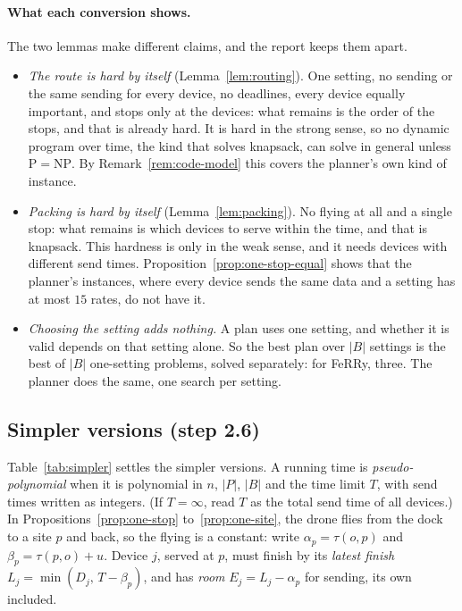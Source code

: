 \paragraph{What each conversion shows.} The two lemmas make different
claims, and the report keeps them apart.
\begin{itemize}
  \item \emph{The route is hard by itself} (Lemma~\ref{lem:routing}). One
    setting, no sending or the same sending for every device, no
    deadlines, every device equally important, and stops only at the
    devices: what remains is the order of the stops, and that is already
    hard. It is hard in the strong sense, so no dynamic program over time,
    the kind that solves knapsack, can solve \PLAN{} in general unless
    $\mathrm{P}=\mathrm{NP}$. By Remark~\ref{rem:code-model} this covers the
    planner's own kind of instance.
  \item \emph{Packing is hard by itself} (Lemma~\ref{lem:packing}). No
    flying at all and a single stop: what remains is which devices to
    serve within the time, and that is knapsack. This hardness is only in
    the weak sense, and it needs devices with different send times.
    Proposition~\ref{prop:one-stop-equal} shows that the planner's
    instances, where every device sends the same data and a setting has
    at most $15$ rates, do not have it.
  \item \emph{Choosing the setting adds nothing.} A plan uses one setting,
    and whether it is valid depends on that setting alone. So the best plan
    over $|B|$ settings is the best of $|B|$ one-setting problems, solved
    separately: for FeRRy, three. The planner does the same, one search
    per setting.
\end{itemize}

\subsection{Simpler versions (step 2.6)}
\label{sec:t1-simpler}

Table~\ref{tab:simpler} settles the simpler versions. A running time is
\emph{pseudo-polynomial} when it is polynomial in $n$, $|P|$, $|B|$ and the
time limit $T$, with send times written as integers. (If $T=\infty$, read
$T$ as the total send time of all devices.) In
Propositions~\ref{prop:one-stop} to~\ref{prop:one-site}, the drone flies
from the dock to a site $p$ and back, so the flying is a constant: write
$\alpha_p=\tau(o,p)$ and $\beta_p=\tau(p,o)+u$. Device $j$, served at $p$,
must finish by its \emph{latest finish} $L_j=\min(D_j,\,T-\beta_p)$, and has
\emph{room} $E_j=L_j-\alpha_p$ for sending, its own included.

